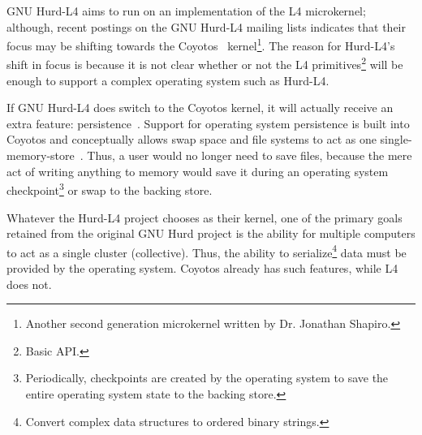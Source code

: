 GNU Hurd-L4 aims to run on an implementation of the L4 microkernel; although,
recent postings on the GNU Hurd-L4 mailing lists indicates that their
focus may be shifting towards the Coyotos~\cite{l4mailings}
kernel\footnote{Another second generation microkernel written by Dr. Jonathan
Shapiro.}.  The reason for Hurd-L4's shift in focus is because it is not
clear whether or not the L4 primitives\footnote{Basic API.} will be enough
to support a complex operating system such as Hurd-L4.

If GNU Hurd-L4 does switch to the Coyotos kernel, it will actually receive
an extra feature: persistence~\cite{shapiro2002DEO}.  Support for operating
system persistence is built into Coyotos and conceptually allows swap space
and file systems to act as one single-memory-store~\cite{shapiro2002DEO}.
Thus, a user would no longer need to save files, because the mere act of
writing anything to memory would save it during an operating system
checkpoint\footnote{Periodically, checkpoints are created by the operating
system to save the entire operating system state to the backing store.}
or swap to the backing store.

Whatever the Hurd-L4 project chooses as their kernel, one of the primary
goals retained from the original GNU Hurd project is the ability
for multiple computers to act as a single cluster (collective).  Thus,
the ability to serialize\footnote{Convert complex data structures to
ordered binary strings.} data must be provided by the operating system.
Coyotos already has such features, while L4 does not.
